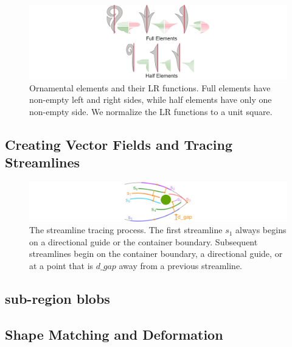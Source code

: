 \begin{figure}
\centering
\includegraphics[width=1.0\textwidth]{figures/flowpak/ornaments.pdf}
\caption[Ornamental elements and their LR functions]
{\label{ornamental_shapes_fig}
Ornamental elements and their LR functions. Full elements have non-empty
left and right sides, while half elements have only one non-empty side. 
We normalize the LR functions to a unit square.}
\end{figure}

\subsection{Creating Vector Fields and Tracing Streamlines}

\begin{figure}
\centering
\includegraphics[width=1.0\textwidth]{figures/flowpak/streamline_tracing.pdf}
\caption[The streamline tracing process]
{\label{streamline_tracing}
The streamline tracing process. The first streamline $s_1$ always begins
on a directional guide or the container boundary.  Subsequent streamlines begin
on the container boundary, a directional guide, or at a point that is 
$d\_gap$ away from a previous streamline.}
\end{figure}

\subsection{sub-region blobs}


\subsection{Shape Matching and Deformation}

